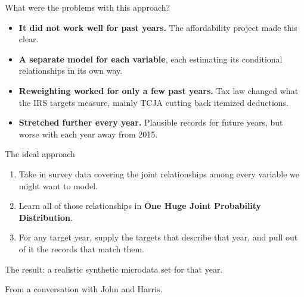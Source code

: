 \documentclass[11pt,aspectratio=169]{beamer}
\newcommand{\slidenote}[1]{\par\vfill{\scriptsize\color{yalegrey}#1}}
\begin{document}
\begin{frame}{What were the problems with this approach?}
  \begin{itemize}
    \item \textbf{It did not work well for past years.} The affordability project made this clear.
    \vspace{0.6em}
    \item \textbf{A separate model for each variable}, each estimating its conditional
          relationships in its own way.
    \vspace{0.6em}
    \item \textbf{Reweighting worked for only a few past years.} Tax law changed what the
          IRS targets measure, mainly TCJA cutting back itemized deductions.
    \vspace{0.6em}
    \item \textbf{Stretched further every year.} Plausible records for future years, but
          worse with each year away from 2015.
  \end{itemize}
\end{frame}

\begin{frame}{The ideal approach}
  \begin{enumerate}
    \item Take in survey data covering the joint relationships among every variable we
          might want to model.
    \vspace{0.6em}
    \item Learn all of those relationships in \textbf{One Huge Joint Probability Distribution}.
    \vspace{0.6em}
    \item For any target year, supply the targets that describe that year, and pull out
          of it the records that match them.
  \end{enumerate}
  \vspace{1em}
  The result: a realistic synthetic microdata set for that year.
  \slidenote{From a conversation with John and Harris.}
\end{frame}

\end{document}
